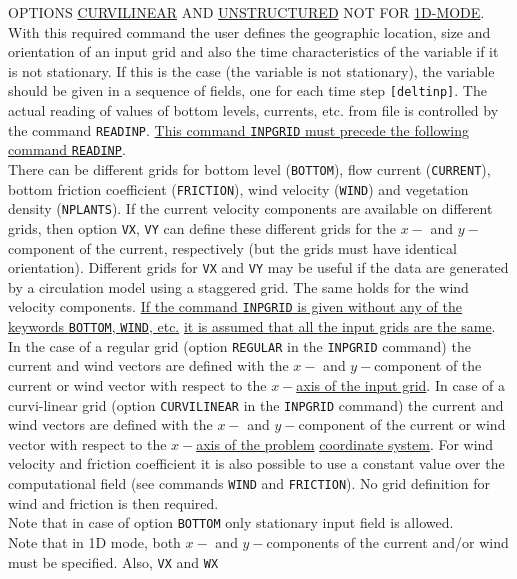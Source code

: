 \documentclass[12pt]{book}
\begin{document}
\noindent
OPTIONS \underline{CURVILINEAR} AND \underline{UNSTRUCTURED} NOT FOR \underline{1D-MODE}.
\\[2ex]
\noindent
With this required command the user defines the geographic location, size and orientation of an input grid
and also the time characteristics of the variable if it is not stationary. If this is the case (the variable is not
stationary), the variable should be given in a sequence of fields, one for each time step {\tt [deltinp]}. The
actual reading of values of bottom levels, currents, etc. from file is controlled by the command {\tt READINP}.
\underline{This command {\tt INPGRID} must precede the following command {\tt READINP}}.
\\[2ex]
\noindent
There can be different grids for bottom level ({\tt BOTTOM}), flow current ({\tt CURRENT}), bottom friction coefficient
({\tt FRICTION}), wind velocity ({\tt WIND}) and vegetation density ({\tt NPLANTS}).
If the current velocity components are available on different grids,
then option {\tt VX}, {\tt VY} can define these different grids for the $x-$ and $y-$component of the current, respectively
(but the grids must have identical orientation). Different grids for {\tt VX} and {\tt VY} may be useful if the data are
generated by a circulation model using a staggered grid. The same holds for the wind velocity
components. \underline{If the command {\tt INPGRID} is given without any of the keywords {\tt BOTTOM}, {\tt WIND}, etc.}
\underline{it is assumed that all the input grids are the same}.
\\[2ex]
\noindent
In the case of a regular grid (option {\tt REGULAR} in the {\tt INPGRID} command) the current and wind vectors
are defined with the $x-$ and $y-$component of the current or wind vector with respect to the \underline{$x-$axis of the input
grid}. In case of a curvi-linear grid (option {\tt CURVILINEAR} in the {\tt INPGRID} command) the current and wind
vectors are defined with the $x-$ and $y-$component of the current or wind vector with respect to the \underline{$x-$axis of
the problem} \underline{coordinate system}. For wind velocity and friction coefficient it is also possible to use a
constant value over the computational field (see commands {\tt WIND} and {\tt FRICTION}). No grid definition for
wind and friction is then required.
\\[2ex]
\noindent
Note that in case of option {\tt BOTTOM} only stationary input field is allowed.
\\[2ex]
\noindent
Note that in 1D mode, both $x-$ and $y-$components of the current and/or wind must be specified. Also, {\tt VX} and {\tt WX}
\end{document}
